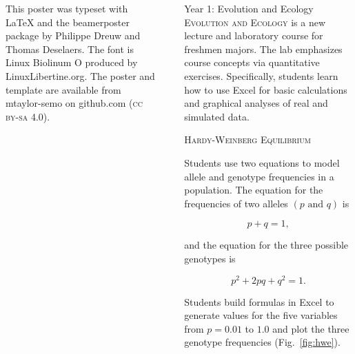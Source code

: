 \documentclass[final,hyperref={pdfpagelabels=false}]{beamer}
\newcommand{\whitespace}{\vspace{0.5\baselineskip}}
\newlength{\sepwid}
\newlength{\onecolwid}
\begin{document}
\begin{frame}[t]
\begin{columns}[t]
\begin{column}{\onecolwid}
		\vspace*{0.35\sepwid}

			{\justifying\small This poster was typeset with \LaTeX{} and the beamerposter package by Philippe Dreuw and Thomas Deselaers. The font is Linux Biolinum O produced by LinuxLibertine.org. The poster and template are available from mtaylor-semo on github.com  (\textsc{cc by-sa 4.0}).}

	\end{column}

	\begin{column}{\sepwid}

	\end{column}
	\begin{column}{\onecolwid}
	    \begin{block}{Year 1: Evolution and Ecology}
    	   	\textsc{Evolution and Ecology} is a new lecture and laboratory course for freshmen majors. The lab emphasizes course concepts via quantitative exercises. Specifically, students learn how to use  Excel for basic calculations and graphical analyses of real and simulated data.
			
			\whitespace
			
			\textcolor{cardiac}{\textsc{Hardy-Weinberg Equilibrium}}
			
			Students use two equations to model allele and genotype frequencies in a population. The equation for the frequencies of two alleles $\left(p \text{ and } q\right)$ is
			
			\begin{equation*}
				p + q = 1,
			\end{equation*}
			
		 	and the equation for the three possible genotypes is
			
			\begin{equation*}
				p^2 + 2pq + q^2 = 1.
			\end{equation*}
						
			Students build formulas in Excel to generate values for the five variables from $p = 0.01$ to $1.0$ and plot the three genotype frequencies (Fig.~\ref{fig:hwe}).
			
			\vspace*{0.5\baselineskip}
			

\end{block}
\end{column}
\end{columns}
\end{frame}
\end{document}
